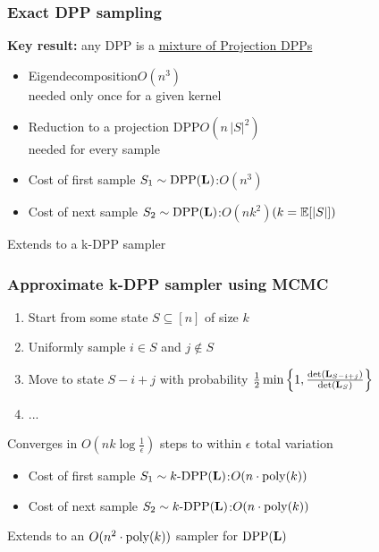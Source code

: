 \documentclass[handout]{beamer}
\begin{document}
\begin{frame}
  \frametitle{Exact DPP sampling}
  \textbf{Key result:} any DPP is a \underline{mixture of Projection
    DPPs} \cite{dpp-independence}\pause
  \vspace{1mm}
  \begin{itemize}
  \item  Eigendecomposition\quad $O(n^3)$\\[-2mm]
{\footnotesize needed only once for a given kernel}
\item Reduction to a projection DPP\quad $O(n\,|S|^2)$\\[-2mm]
  {\footnotesize needed for every sample}
    \end{itemize}
    \pause
    \vspace{5mm}
    
    \begin{block}{}
  \begin{itemize}
  \item Cost of first sample $S_1\sim{\mathrm{DPP}}(\mathbf{L})$:\quad $O(n^3)$\pause
    \item Cost of next sample $S_2\sim{\mathrm{DPP}}(\mathbf{L})$:\quad$O(nk^2)$\hfill$(k=\mathbb E[|S|])$
    \end{itemize}
    \end{block}\pause
    Extends to a k-DPP sampler \small\cite{k-dpp}
    
\end{frame}

\begin{frame}
  \frametitle{Approximate k-DPP sampler using MCMC}
  \begin{enumerate}
  \item Start from some state $S\subseteq[n]$ of size $k$\pause
  \item Uniformly sample $i\in S$ and $j\not\in S$\pause
  \item Move to state $S-i+j$ with probability $\frac12
    \min\Big\{1,\frac{\det(\mathbf{L}_{S-i+j})}{\det(\mathbf{L}_S)}\Big\}$\pause
    \item ...
    \end{enumerate}
    Converges in $O(nk\log\frac1\epsilon)$ steps to within $\epsilon$
    total variation \cite{rayleigh-mcmc}
    \pause\vspace{2mm}
    \begin{block}{}
  \begin{itemize}
  \item Cost of first sample $S_1\sim k\text{-}{\mathrm{DPP}}(\mathbf{L})$:\quad $O(n\cdot{\mathrm{poly}}(k))$\pause
    \item Cost of next sample $S_2\sim k\text{-}{\mathrm{DPP}}(\mathbf{L})$:\quad$O(n\cdot{\mathrm{poly}}(k))$
    \end{itemize}
  \end{block}\pause
Extends to an $O(n^2\cdot{\mathrm{poly}}(k))$ sampler for ${\mathrm{DPP}}(\mathbf{L})$ \ \small\cite{kdpp-mcmc}
  
\end{frame}
\end{document}
